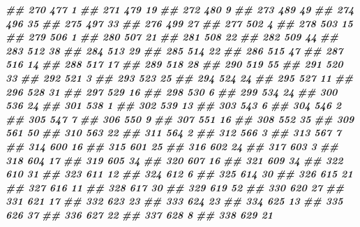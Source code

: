 \documentclass[
]{book}
\newenvironment{Shaded}{\begin{snugshade}}{\end{snugshade}}
\newcommand{\DocumentationTok}[1]{\textcolor[rgb]{0.56,0.35,0.01}{\textbf{\textit{#1}}}}
\theoremstyle{definition}
\theoremstyle{definition}
\theoremstyle{definition}
\theoremstyle{definition}
\theoremstyle{remark}
\begin{document}
\begin{Shaded}
\begin{Highlighting}[]
\DocumentationTok{\#\# 270    477  1}
\DocumentationTok{\#\# 271    479 19}
\DocumentationTok{\#\# 272    480  9}
\DocumentationTok{\#\# 273    489 49}
\DocumentationTok{\#\# 274    496 35}
\DocumentationTok{\#\# 275    497 33}
\DocumentationTok{\#\# 276    499 27}
\DocumentationTok{\#\# 277    502  4}
\DocumentationTok{\#\# 278    503 15}
\DocumentationTok{\#\# 279    506  1}
\DocumentationTok{\#\# 280    507 21}
\DocumentationTok{\#\# 281    508 22}
\DocumentationTok{\#\# 282    509 44}
\DocumentationTok{\#\# 283    512 38}
\DocumentationTok{\#\# 284    513 29}
\DocumentationTok{\#\# 285    514 22}
\DocumentationTok{\#\# 286    515 47}
\DocumentationTok{\#\# 287    516 14}
\DocumentationTok{\#\# 288    517 17}
\DocumentationTok{\#\# 289    518 28}
\DocumentationTok{\#\# 290    519 55}
\DocumentationTok{\#\# 291    520 33}
\DocumentationTok{\#\# 292    521  3}
\DocumentationTok{\#\# 293    523 25}
\DocumentationTok{\#\# 294    524 24}
\DocumentationTok{\#\# 295    527 11}
\DocumentationTok{\#\# 296    528 31}
\DocumentationTok{\#\# 297    529 16}
\DocumentationTok{\#\# 298    530  6}
\DocumentationTok{\#\# 299    534 24}
\DocumentationTok{\#\# 300    536 24}
\DocumentationTok{\#\# 301    538  1}
\DocumentationTok{\#\# 302    539 13}
\DocumentationTok{\#\# 303    543  6}
\DocumentationTok{\#\# 304    546  2}
\DocumentationTok{\#\# 305    547  7}
\DocumentationTok{\#\# 306    550  9}
\DocumentationTok{\#\# 307    551 16}
\DocumentationTok{\#\# 308    552 35}
\DocumentationTok{\#\# 309    561 50}
\DocumentationTok{\#\# 310    563 22}
\DocumentationTok{\#\# 311    564  2}
\DocumentationTok{\#\# 312    566  3}
\DocumentationTok{\#\# 313    567  7}
\DocumentationTok{\#\# 314    600 16}
\DocumentationTok{\#\# 315    601 25}
\DocumentationTok{\#\# 316    602 24}
\DocumentationTok{\#\# 317    603  3}
\DocumentationTok{\#\# 318    604 17}
\DocumentationTok{\#\# 319    605 34}
\DocumentationTok{\#\# 320    607 16}
\DocumentationTok{\#\# 321    609 34}
\DocumentationTok{\#\# 322    610 31}
\DocumentationTok{\#\# 323    611 12}
\DocumentationTok{\#\# 324    612  6}
\DocumentationTok{\#\# 325    614 30}
\DocumentationTok{\#\# 326    615 21}
\DocumentationTok{\#\# 327    616 11}
\DocumentationTok{\#\# 328    617 30}
\DocumentationTok{\#\# 329    619 52}
\DocumentationTok{\#\# 330    620 27}
\DocumentationTok{\#\# 331    621 17}
\DocumentationTok{\#\# 332    623 23}
\DocumentationTok{\#\# 333    624 23}
\DocumentationTok{\#\# 334    625 13}
\DocumentationTok{\#\# 335    626 37}
\DocumentationTok{\#\# 336    627 22}
\DocumentationTok{\#\# 337    628  8}
\DocumentationTok{\#\# 338    629 21}

\end{Highlighting}
\end{Shaded}
\end{document}
